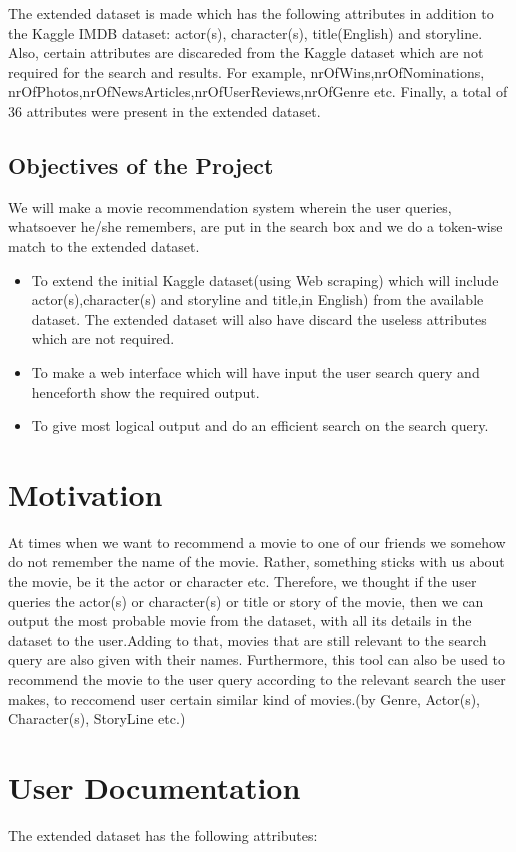 \documentclass{article}
\begin{document}
    The extended dataset is made which has the following attributes in addition to the Kaggle IMDB dataset:
    actor(s), character(s), title(English) and storyline.
    Also, certain attributes are discareded from the Kaggle dataset which are not required for the search and results. For example,
    nrOfWins,nrOfNominations,
    nrOfPhotos,nrOfNewsArticles,nrOfUserReviews,nrOfGenre etc.
    Finally, a total of 36 attributes were present in the extended dataset.
    
\subsection{Objectives of the Project}
  We will make a movie recommendation system wherein the user
queries, whatsoever he/she remembers, are put in the search box
and we do a token-wise match to the extended dataset. 
\begin{itemize}
\item To extend the initial Kaggle dataset(using Web scraping) which will include actor(s),character(s) and storyline and title,in English) from the available dataset. The extended dataset will also have discard the useless attributes which are not required. 
\item To make a web interface which will have input the user search query and henceforth show the required output.
\item To give most logical output and do an efficient search on the search query.
\end{itemize}
\section{Motivation}
 At times when we want to recommend a movie to one of our friends we somehow do not remember the name of the movie. Rather, something sticks with us about the movie, be it the actor or character etc. Therefore, we thought if the user queries the actor(s) or character(s) or title or story of the movie, then we can output the most probable movie from the dataset, with all its details in the dataset to the user.Adding to that, movies that are still relevant to the search query are also given with their names.
 Furthermore, this tool can also be used to recommend the movie to the user query according to the relevant search the user makes, to reccomend user certain similar kind of movies.(by Genre, Actor(s), Character(s), StoryLine etc.)
 
 \section{User Documentation}
 The extended dataset has the following attributes:
 
\end{document}
